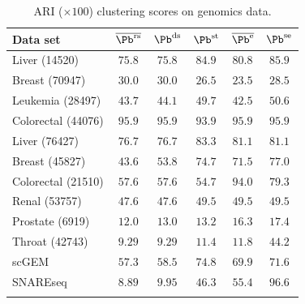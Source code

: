 
\begin{table}
    \caption{ARI ($\times 100$) clustering scores on genomics data.}
    \begin{small}
    \begin{sc}
    \begin{tabular}{lc@{\hskip 0.1in}c@{\hskip 0.1in}c@{\hskip 0.1in}c@{\hskip 0.1in}c}
    \toprule[1.5pt]
    Data set & $\overline{\Pb^{\mathrm{rs}}}$ & $\Pb^{\mathrm{ds}}$ & $\Pb^{\mathrm{st}}$ & $\overline{\Pb^{\mathrm{e}}}$ & $\Pb^{\mathrm{se}}$ \\
    \midrule
    Liver \tiny{(14520)} & $75.8$ & $75.8$ & $84.9$ & $80.8$ & $\mathbf{85.9}$ \\
    Breast \tiny{(70947)} & $\mathbf{30.0}$ & $\mathbf{30.0}$ & $26.5$ & $23.5$ & $28.5$ \\
    Leukemia \tiny{(28497)} & $43.7$ & $44.1$ & $49.7$ & $42.5$ & $\mathbf{50.6}$ \\
    Colorectal \tiny{(44076)} & $\mathbf{95.9}$ & $\mathbf{95.9}$ & $93.9$ & $\mathbf{95.9}$ & $\mathbf{95.9}$ \\
    Liver \tiny{(76427)} & $76.7$ & $76.7$ & $\mathbf{83.3}$ & $81.1$ & $81.1$ \\
    Breast \tiny{(45827)} & $43.6$ & $53.8$ & $74.7$ & $71.5$ & $\mathbf{77.0}$ \\
    Colorectal \tiny{(21510)} & $57.6$ & $57.6$ & $54.7$ & $\mathbf{94.0}$ & $79.3$ \\
    Renal \tiny{(53757)} & $47.6$ & $47.6$ & $\mathbf{49.5}$ & $\mathbf{49.5}$ & $\mathbf{49.5}$ \\
    Prostate \tiny{(6919)} & $12.0$ & $13.0$ & $13.2$ & $16.3$ & $\mathbf{17.4}$ \\
    Throat \tiny{(42743)} & $9.29$ & $9.29$ & $11.4$ & $11.8$ & $\mathbf{44.2}$ \\
    \midrule[0.2pt]
    scGEM & $57.3$ & $58.5$ & $\mathbf{74.8}$ & $69.9$ & $71.6$ \\
    SNAREseq & $8.89$ & $9.95$ & $46.3$ & $55.4$ & $\mathbf{96.6}$ \\
    \bottomrule[1.5pt]
    \label{table_spectral_microaray}
    \end{tabular}
    \end{sc}
\end{small}
\end{table}

